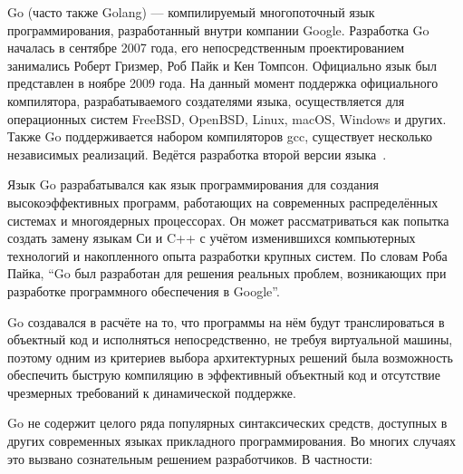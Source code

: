 Go (часто также Golang) — компилируемый многопоточный язык программирования, разработанный внутри компании Google. Разработка Go началась в сентябре 2007 года, его непосредственным проектированием занимались Роберт Гризмер, Роб Пайк и Кен Томпсон. Официально язык был представлен в ноябре 2009 года. На данный момент поддержка официального компилятора, разрабатываемого создателями языка, осуществляется для операционных систем FreeBSD, OpenBSD, Linux, macOS, Windows и других. Также Go поддерживается набором компиляторов gcc, существует несколько независимых реализаций. Ведётся разработка второй версии языка~\cite{golang}.

Язык Go разрабатывался как язык программирования для создания высокоэффективных программ, работающих на современных распределённых системах и многоядерных процессорах. Он может рассматриваться как попытка создать замену языкам Си и C++ с учётом изменившихся компьютерных технологий и накопленного опыта разработки крупных систем. По словам Роба Пайка, ``Go был разработан для решения реальных проблем, возникающих при разработке программного обеспечения в Google''.

Go создавался в расчёте на то, что программы на нём будут транслироваться в объектный код и исполняться непосредственно, не требуя виртуальной машины, поэтому одним из критериев выбора архитектурных решений была возможность обеспечить быструю компиляцию в эффективный объектный код и отсутствие чрезмерных требований к динамической поддержке.

Go не содержит целого ряда популярных синтаксических средств, доступных в других современных языках прикладного программирования. Во многих случаях это вызвано сознательным решением разработчиков. В частности:

